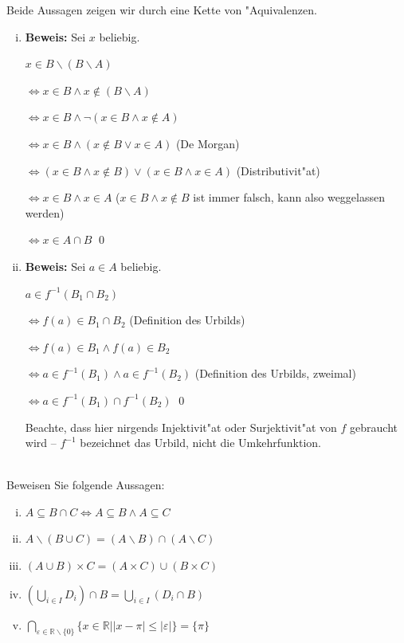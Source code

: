 \begin{loesung}
Beide Aussagen zeigen wir durch eine Kette von "Aquivalenzen.
\begin{enumerate}[(i)]
\item \textbf{Beweis:} Sei $x$ beliebig.

$x\in B\backslash(B\backslash A)$

$\Leftrightarrow x\in B\wedge x\notin(B\backslash A)$

$\Leftrightarrow x\in B\wedge\neg(x\in B\wedge x\notin A)$

$\Leftrightarrow x\in B\wedge(x\notin B\vee x\in A)$ (De Morgan)

$\Leftrightarrow (x\in B\wedge x\notin B)\vee(x\in B\wedge x\in A)$ (Distributivit"at)

$\Leftrightarrow x\in B\wedge x\in A$ ($x\in B\wedge x\notin B$ ist immer falsch, kann also weggelassen werden)

$\Leftrightarrow x\in A\cap B$ \qed

\item \textbf{Beweis:} Sei $a\in A$ beliebig.

$a\in f^{-1}(B_1\cap B_2)$

$\Leftrightarrow f(a)\in B_1\cap B_2$ (Definition des Urbilds)

$\Leftrightarrow f(a)\in B_1\wedge f(a)\in B_2$

$\Leftrightarrow a\in f^{-1}(B_1)\wedge a\in f^{-1}(B_2)$ (Definition des Urbilds, zweimal)

$\Leftrightarrow a\in f^{-1}(B_1)\cap f^{-1}(B_2)$ \qed

Beachte, dass hier nirgends Injektivit"at oder Surjektivit"at von $f$ gebraucht wird -- $f^{-1}$ bezeichnet das Urbild, nicht die Umkehrfunktion.
\end{enumerate}
\end{loesung}


 \\
Beweisen Sie folgende Aussagen:
\begin{enumerate}[(i)]
  \item $A\subseteq B\cap C\Leftrightarrow A\subseteq B\wedge A\subseteq C$
  \item $A\backslash(B\cup C)=(A\backslash B)\cap (A\backslash C)$
  \item $(A\cup B)\times C=(A\times C)\cup (B\times C)$
  \item $\left(\bigcup_{i\in I}D_i\right)\cap B=\bigcup_{i\in I}(D_i\cap B)$
  \item $\bigcap_{\varepsilon\in\mathbb{R}\backslash\{0\}}\{x\in\mathbb{R}||x-\pi|\leq |\varepsilon|\}=\{\pi\}$
\end{enumerate}

